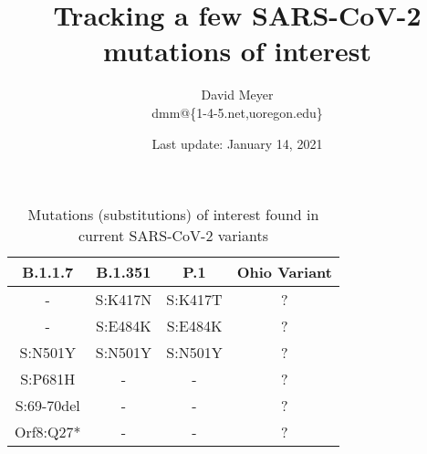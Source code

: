 \documentclass[11pt, oneside]{article}   	%
\title{Tracking a few SARS-CoV-2 mutations of interest}
\author{David Meyer \\ dmm@\{1-4-5.net,uoregon.edu\}}
\date{Last update: January 14, 2021}							%
\begin{document}
\maketitle

\begin{table} [H]
  \begin{center}
    \begin{tabular}{c|c|c|c} 
      \textbf{B.1.1.7} & \textbf{B.1.351} & \textbf{P.1} & \textbf{Ohio Variant} \\
      \hline 
      \hline 
      - & S:K417N & S:K417T & ? \\
      - & S:E484K & S:E484K & ? \\
      S:N501Y & S:N501Y & S:N501Y & ? \\
      S:P681H & - & - & ? \\
      S:69-70del & - &- & ? \\
      Orf8:Q27* & - & - & ? \\
    \end{tabular}
  \end{center}
 \caption{Mutations (substitutions) of interest found in current SARS-CoV-2 variants}
\end{table}
\end{document}
